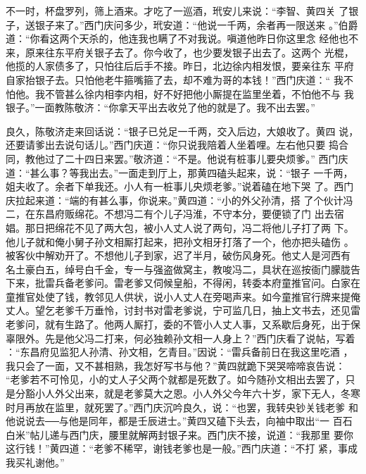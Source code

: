 不一时，杯盘罗列，筛上酒来。才吃了一巡酒，玳安儿来说：“李智、黄四关
了银子，送银子来了。”西门庆问多少，玳安道：“他说一千两，余者再一限送来
。”伯爵道：“你看这两个天杀的，他连我也瞒了不对我说。嗔道他昨日你这里念
经他也不来，原来往东平府关银子去了。你今收了，也少要发银子出去了。这两个
光棍，他揽的人家债多了，只怕往后后手不接。昨日，北边徐内相发恨，要亲往东
平府自家抬银子去。只怕他老牛箍嘴箍了去，却不难为哥的本钱！”西门庆道：“
我不怕他。我不管甚么徐内相李内相，好不好把他小厮提在监里坐着，不怕他不与
我银子。”一面教陈敬济：“你拿天平出去收兑了他的就是了。我不出去罢。”

良久，陈敬济走来回话说：“银子已兑足一千两，交入后边，大娘收了。黄四
说，还要请爹出去说句话儿。”西门庆道：“你只说我陪着人坐着哩。左右他只要
捣合同，教他过了二十四日来罢。”敬济道：“不是。他说有桩事儿要央烦爹。”
西门庆道：“甚么事？等我出去。”一面走到厅上，那黄四磕头起来，说：“银子
一千两，姐夫收了。余者下单我还。小人有一桩事儿央烦老爹。”说着磕在地下哭
了。西门庆拉起来道：“端的有甚么事，你说来。”黄四道：“小的外父孙清，搭
了个伙计冯二，在东昌府贩绵花。不想冯二有个儿子冯淮，不守本分，要便锁了门
出去宿娼。那日把绵花不见了两大包，被小人丈人说了两句，冯二将他儿子打了两
下。他儿子就和俺小舅子孙文相厮打起来，把孙文相牙打落了一个，他亦把头磕伤
。被客伙中解劝开了。不想他儿子到家，迟了半月，破伤风身死。他丈人是河西有
名土豪白五，绰号白千金，专一与强盗做窝主，教唆冯二，具状在巡按衙门朦胧告
下来，批雷兵备老爹问。雷老爹又伺候皇船，不得闲，转委本府童推官问。白家在
童推官处使了钱，教邻见人供状，说小人丈人在旁喝声来。如今童推官行牌来提俺
丈人。望乞老爹千万垂怜，讨封书对雷老爹说，宁可监几日，抽上文书去，还见雷
老爹问，就有生路了。他两人厮打，委的不管小人丈人事，又系歇后身死，出于保
辜限外。先是他父冯二打来，何必独赖孙文相一人身上？”西门庆看了说帖，写着
：“东昌府见监犯人孙清、孙文相，乞青目。”因说：“雷兵备前日在我这里吃酒
，我只会了一面，又不甚相熟，我怎好写书与他？”黄四就跪下哭哭啼啼哀告说：
“老爹若不可怜见，小的丈人子父两个就都是死数了。如今随孙文相出去罢了，只
是分豁小人外父出来，就是老爹莫大之恩。小人外父今年六十岁，家下无人，冬寒
时月再放在监里，就死罢了。”西门庆沉吟良久，说：“也罢，我转央钞关钱老爹
和他说说去──与他是同年，都是壬辰进士。”黄四又磕下头去，向袖中取出“一
百石白米”帖儿递与西门庆，腰里就解两封银子来。西门庆不接，说道：“我那里
要你这行钱！”黄四道：“老爹不稀罕，谢钱老爹也是一般。”西门庆道：“不打
紧，事成我买礼谢他。”

